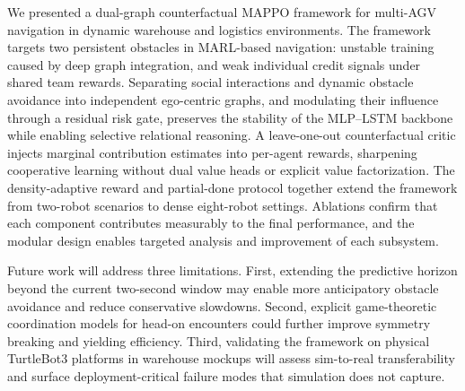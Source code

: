 \documentclass[journal,twoside,web]{ieeecolor}
\begin{document}
We presented a dual-graph counterfactual MAPPO framework for multi-AGV navigation in dynamic warehouse and logistics environments. The framework targets two persistent obstacles in MARL-based navigation: unstable training caused by deep graph integration, and weak individual credit signals under shared team rewards. Separating social interactions and dynamic obstacle avoidance into independent ego-centric graphs, and modulating their influence through a residual risk gate, preserves the stability of the MLP--LSTM backbone while enabling selective relational reasoning. A leave-one-out counterfactual critic injects marginal contribution estimates into per-agent rewards, sharpening cooperative learning without dual value heads or explicit value factorization. The density-adaptive reward and partial-done protocol together extend the framework from two-robot scenarios to dense eight-robot settings. Ablations confirm that each component contributes measurably to the final performance, and the modular design enables targeted analysis and improvement of each subsystem.

Future work will address three limitations. First, extending the predictive horizon beyond the current two-second window may enable more anticipatory obstacle avoidance and reduce conservative slowdowns. Second, explicit game-theoretic coordination models for head-on encounters could further improve symmetry breaking and yielding efficiency. Third, validating the framework on physical TurtleBot3 platforms in warehouse mockups will assess sim-to-real transferability and surface deployment-critical failure modes that simulation does not capture.



\end{document}
